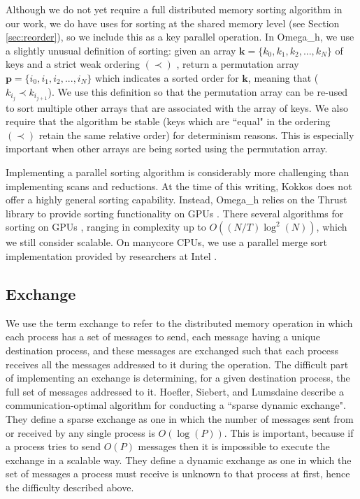 Although we do not yet require a full distributed memory sorting algorithm
in our work, we do have uses for sorting at the shared memory level
(see Section \ref{sec:reorder}), so we include this as a key parallel operation.
In Omega\_h, we use a slightly unusual definition of sorting:
given an array $\mathbf{k}=\{k_0,k_1,k_2,...,k_N\}$ of keys and
a strict weak ordering $(\prec)$ \cite{roberts2009applied},
return a permutation array
$\mathbf{p}=\{i_0,i_1,i_2,...,i_N\}$ which indicates
a sorted order for $\mathbf{k}$, meaning that ($k_{i_j} \prec k_{i_{j+1}}$).
We use this definition so that the permutation array can be re-used
to sort multiple other arrays that are associated with the array of keys.
We also require that the algorithm be stable (keys which are ``equal"
in the ordering $(\prec)$ retain the same relative order) for
determinism reasons.
This is especially important when other arrays are being sorted
using the permutation array.

Implementing a parallel sorting algorithm is considerably more
challenging than implementing scans and reductions.
At the time of this writing, Kokkos does not offer a highly general
sorting capability.
Instead, Omega\_h relies on the Thrust library to provide sorting functionality
on GPUs \cite{bell2011thrust}.
There several algorithms for sorting on GPUs \cite{satish2009designing},
ranging in complexity up to $O((N/T)\log^2(N))$, which we still consider
scalable.
On manycore CPUs, we use a parallel merge sort implementation provided
by researchers at Intel \cite{robinson2014parallel}.

\subsection{Exchange}
\label{sec:exch}

We use the term exchange to refer to the distributed memory operation
in which each process has a set of messages to send, each message
having a unique destination process, and these messages are exchanged
such that each process receives all the messages addressed to it
during the operation.
The difficult part of implementing an exchange is determining, for
a given destination process, the full set of messages addressed to it.
Hoefler, Siebert, and Lumsdaine \cite{hoefler2010scalable} describe
a communication-optimal algorithm for conducting a ``sparse dynamic exchange".
They define a sparse exchange as one in which the number of messages
sent from or received by any single process is $O(\log(P))$.
This is important, because if a process tries to send $O(P)$ messages
then it is impossible to execute the exchange in a scalable way.
They define a dynamic exchange as one in which the set of messages
a process must receive is unknown to that process at first, hence
the difficulty described above.

